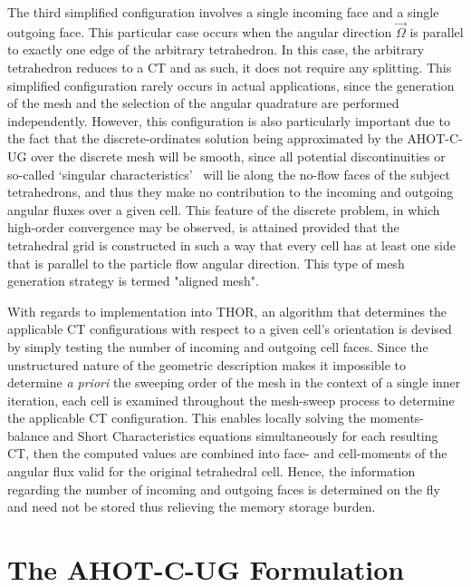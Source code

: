The third simplified configuration involves a single incoming face and a single outgoing face.
This particular case occurs when the angular direction $\vec{\Omega}$ is parallel to exactly one edge of the arbitrary tetrahedron.
In this case, the arbitrary tetrahedron reduces to a CT and as such, it does not require any splitting.
This simplified configuration rarely occurs in actual applications, since the generation of the mesh and the selection of the angular quadrature are performed independently.
However, this configuration is also particularly important due to the fact that the discrete-ordinates solution being approximated by the \ac{AHOT-C-UG} over the discrete mesh will be smooth, since all potential discontinuities or so-called ‘singular characteristics’~\cite{Duo2009} will lie along the no-flow faces of the subject tetrahedrons, and thus they make no contribution to the incoming and outgoing angular fluxes over a given cell.
This feature of the discrete problem, in which high-order convergence may be observed, is attained provided that the tetrahedral grid is constructed in such a way that every cell has at least one side that is parallel to the particle flow angular direction.
This type of mesh generation strategy is termed "aligned mesh".

With regards to implementation into \ac{THOR}, an algorithm that determines the applicable CT configurations with respect to a given cell's orientation is devised by simply testing the number of incoming and outgoing cell faces.
Since the unstructured nature of the geometric description makes it impossible to determine \textit{a priori} the sweeping order of the mesh in the context of a single inner iteration, each cell is examined throughout the mesh-sweep process to determine the applicable CT configuration.
This enables locally solving the moments-balance and Short Characteristics equations simultaneously for each resulting CT, then the computed values are combined into face- and cell-moments of the angular flux valid for the original tetrahedral cell.
Hence, the information regarding the number of incoming and outgoing faces is determined on the fly and need not be stored thus relieving the memory storage burden.

\section{The \ac{AHOT-C-UG} Formulation}

